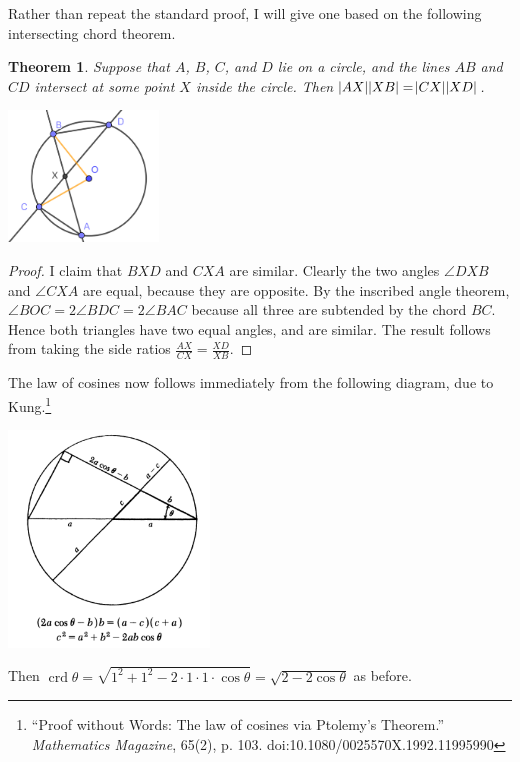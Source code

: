 \documentclass[a4paper,leqno]{article}
\numberwithin{equation}{section}
\newtheorem{thm}[equation]{Theorem}
\theoremstyle{definition}
\theoremstyle{remark}
\DeclareMathOperator{\crd}{crd}
\begin{document}
Rather than repeat the standard proof, I will give one based on the following intersecting chord theorem.
\begin{thm}
  Suppose that $ A $, $ B $, $ C $, and $ D $ lie on a circle, and the lines $ AB $ and $ CD $ intersect at
  some point $ X $ inside the circle. Then $ \abs{AX} \abs{XB} = \abs{CX} \abs{XD} $.
\end{thm}
\begin{center}
  \includegraphics[width=0.3\textwidth]{ichords}
\end{center}
\begin{proof}
  I claim that $ BXD $ and $ CXA $ are similar. Clearly the two angles $ \angle DXB $ and $ \angle CXA $ are
  equal, because they are opposite. By the inscribed angle theorem, $ \angle BOC = 2\angle BDC = 2\angle BAC $
  because all three are subtended by the chord $ BC $. Hence both triangles have two equal angles, and are similar.
  The result follows from taking the side ratios $ \frac{AX}{CX} = \frac{XD}{XB} $.
\end{proof}

The law of cosines now follows immediately from the following diagram, due to Kung.\footnote{``Proof without Words: The law of cosines via Ptolemy's Theorem.'' \textit{Mathematics Magazine}, 65(2), p. 103. doi:10.1080/0025570X.1992.11995990}
\begin{center}
  \includegraphics[width=0.4\textwidth]{cosinelawproof}
\end{center}

Then $ \crd \theta = \sqrt{1^2 + 1^2 - 2\cdot1\cdot1\cdot \cos \theta} = \sqrt{2 - 2\cos \theta} $ as before.
\end{document}
